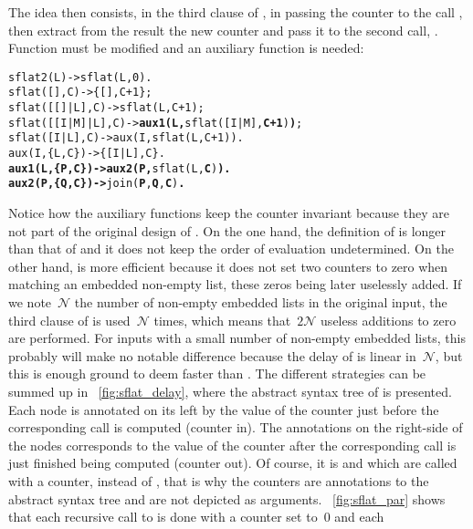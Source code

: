 The idea then consists, in the third clause of , in
passing the counter  to the call
, then extract from the result the
new counter and pass it to the second call,
. Function  must be
modified and an auxiliary function  is needed:
\begin{alltt}
sflat2(L)          -> sflat(L,0).
sflat(       [],C) -> \{[],C+1\};
sflat(   [[]|L],C) -> sflat(L,C+1);
sflat([[I|M]|L],C) -> \textbf{aux1(L,}sflat([I|M],\textbf{C+1})\textbf{)};
sflat(    [I|L],C) -> aux(I,sflat(L,C+1)).
aux(I,\{L,C\})       -> \{[I|L],C\}.
\textbf{aux1(L,\{P,C\})      -> aux2(P,}sflat(L,\textbf{C})\textbf{).}
\textbf{aux2(P,\{Q,C\})      ->} join(\textbf{P},\textbf{Q},\textbf{C})\textbf{.}
\end{alltt}
Notice how the auxiliary functions keep the counter invariant because
they are not part of the original design of . On the
one hand, the definition of  is longer than that of
 and it does not keep the order of evaluation
undetermined. On the other hand,  is more efficient
because it does not set two counters to zero when matching an embedded
non\hyp{}empty list, these zeros being later uselessly added. If we
note~\(\mathcal{N}\) the number of non\hyp{}empty embedded lists in
the original input, the third clause of  is
used~\(\mathcal{N}\) times, which means that~\(2 \mathcal{N}\) useless
additions to zero are performed. For inputs with a small number of
non\hyp{}empty embedded lists, this probably will make no notable
difference because the delay of  is linear
in~\(\mathcal{N}\), but this is enough ground to deem
 faster than . The different
strategies can be summed up in \fig~\ref{fig:sflat_delay}, where the
abstract syntax tree of  is
presented. Each node is annotated on its left by the value of the
counter just before the corresponding call is computed (counter
in). The annotations on the right\hyp{}side of the nodes corresponds
to the value of the counter after the corresponding call is just
finished being computed (counter out). Of course, it is
 and  which are called with a
counter, instead of , that is why the counters are
annotations to the abstract syntax tree and are not depicted as
arguments. \Fig~\vref{fig:sflat_par} shows that each recursive call
to  is done with a counter set to~\(0\) and each
